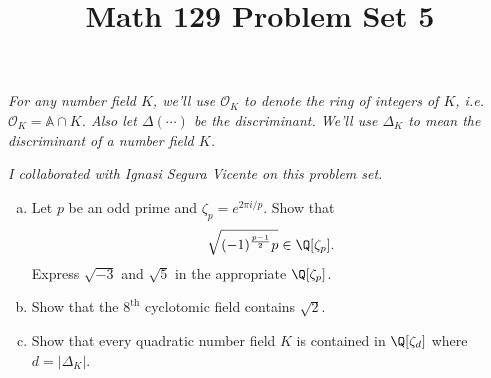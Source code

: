 \documentclass[11pt,letterpaper]{article}
\title{\textbf{Math 129 Problem Set 5}}
\begin{document}
\maketitle

\textit{For any number field $K$, we'll use $\mathcal{O}_K$ to denote the ring of integers of $K$, i.e. $\mathcal{O}_K = \mathbb{A}\cap K$. Also let $\Delta(\cdots)$ be the discriminant. We'll use $\Delta_K$ to mean the discriminant of a number field $K$.}

\textit{I collaborated with Ignasi Segura Vicente on this problem set.}

\begin{cproblem}{2.8}\noindent
    \begin{enumerate}[(a)]
        \item Let $p$ be an odd prime and $\zeta_p=e^{2\pi i /p}$. Show that \[
            \sqrt{(-1)^{\frac{p-1}{2}}p}\in \Q[\zeta_p]
        .\] 
        Express $\sqrt{-3}$ and $\sqrt{5}$ in the appropriate $\Q[\zeta_p]$.
        \item Show that the $8^{\textrm{th}}$ cyclotomic field contains $\sqrt{2}$.
        \item Show that every quadratic number field $K$ is contained in $\Q[\zeta_d]$ where $d=|\Delta_K|$.
    \end{enumerate}
\end{cproblem}
\end{document}
